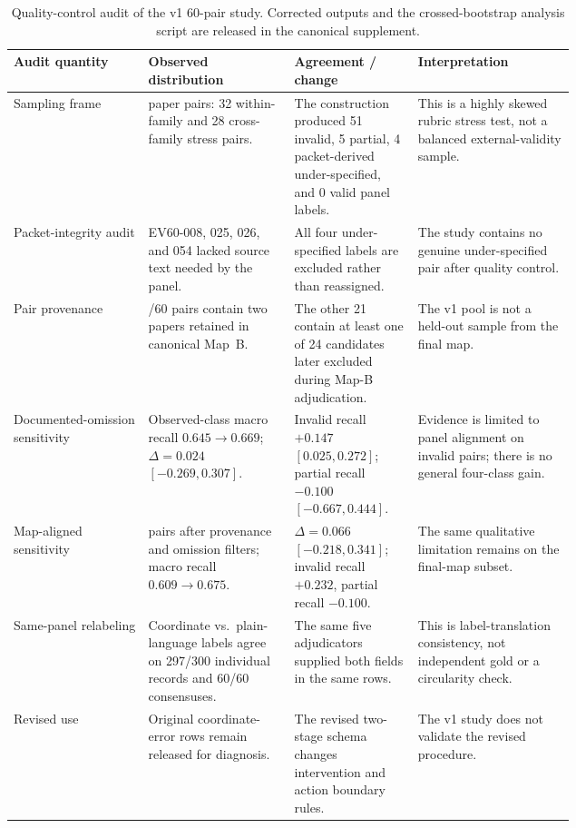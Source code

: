 \begin{table}[t]
\centering
\scriptsize
\renewcommand{\arraystretch}{0.9}
\begin{tabularx}{\linewidth}{>{\raggedright\arraybackslash}p{0.24\linewidth}>{\raggedright\arraybackslash}p{0.26\linewidth}>{\raggedright\arraybackslash}p{0.22\linewidth}X}
\toprule
\textbf{Audit quantity} & \textbf{Observed distribution} & \textbf{Agreement / change} & \textbf{Interpretation} \\
\midrule
Sampling frame & 60 paper pairs: 32 within-family and 28 cross-family stress pairs. & The construction produced 51 invalid, 5 partial, 4 packet-derived under-specified, and 0 valid panel labels. & This is a highly skewed rubric stress test, not a balanced external-validity sample. \\
Packet-integrity audit & EV60-008, 025, 026, and 054 lacked source text needed by the panel. & All four under-specified labels are excluded rather than reassigned. & The study contains no genuine under-specified pair after quality control. \\
Pair provenance & 39/60 pairs contain two papers retained in canonical Map~B. & The other 21 contain at least one of 24 candidates later excluded during Map-B adjudication. & The v1 pool is not a held-out sample from the final map. \\
Documented-omission sensitivity & Observed-class macro recall $0.645\to0.669$; $\Delta=0.024$ $[-0.269,0.307]$. & Invalid recall $+0.147$ $[0.025,0.272]$; partial recall $-0.100$ $[-0.667,0.444]$. & Evidence is limited to panel alignment on invalid pairs; there is no general four-class gain. \\
Map-aligned sensitivity & 38 pairs after provenance and omission filters; macro recall $0.609\to0.675$. & $\Delta=0.066$ $[-0.218,0.341]$; invalid recall $+0.232$, partial recall $-0.100$. & The same qualitative limitation remains on the final-map subset. \\
Same-panel relabeling & Coordinate vs.\ plain-language labels agree on 297/300 individual records and 60/60 consensuses. & The same five adjudicators supplied both fields in the same rows. & This is label-translation consistency, not independent gold or a circularity check. \\
Revised use & Original coordinate-error rows remain released for diagnosis. & The revised two-stage schema changes intervention and action boundary rules. & The v1 study does not validate the revised procedure. \\
\bottomrule
\end{tabularx}
\caption{Quality-control audit of the v1 60-pair study. Corrected outputs and the crossed-bootstrap analysis script are released in the canonical supplement.}
\label{tab:systematic-pair-audit-summary}
\end{table}
